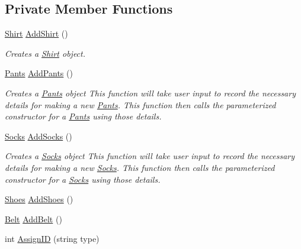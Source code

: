 \subsection*{Private Member Functions}
\begin{DoxyCompactItemize}
\item 
\mbox{\hyperlink{classShirt}{Shirt}} \mbox{\hyperlink{classCloset_aba3296cf8964b43f64911cc69c56cbfd}{Add\+Shirt}} ()
\begin{DoxyCompactList}\small\item\em Creates a \textquotesingle{}\mbox{\hyperlink{classShirt}{Shirt}}\textquotesingle{} object. \end{DoxyCompactList}\item 
\mbox{\hyperlink{classPants}{Pants}} \mbox{\hyperlink{classCloset_a86001d9aab63ec5cca05bb2daa67e755}{Add\+Pants}} ()
\begin{DoxyCompactList}\small\item\em Creates a \textquotesingle{}\mbox{\hyperlink{classPants}{Pants}}\textquotesingle{} object  This function will take user input to record the necessary details for making a new \textquotesingle{}\mbox{\hyperlink{classPants}{Pants}}\textquotesingle{}. This function then calls the parameterized constructor for a \textquotesingle{}\mbox{\hyperlink{classPants}{Pants}}\textquotesingle{} using those details. \end{DoxyCompactList}\item 
\mbox{\hyperlink{classSocks}{Socks}} \mbox{\hyperlink{classCloset_aac44ecf78525b3e0ac4ed80af2133186}{Add\+Socks}} ()
\begin{DoxyCompactList}\small\item\em Creates a \textquotesingle{}\mbox{\hyperlink{classSocks}{Socks}}\textquotesingle{} object This function will take user input to record the necessary details for making a new \textquotesingle{}\mbox{\hyperlink{classSocks}{Socks}}\textquotesingle{}. This function then calls the parameterized constructor for a \textquotesingle{}\mbox{\hyperlink{classSocks}{Socks}}\textquotesingle{} using those details. \end{DoxyCompactList}\item 
\mbox{\hyperlink{classShoes}{Shoes}} \mbox{\hyperlink{classCloset_a489badac5a919460e8cc8e216f8b3eac}{Add\+Shoes}} ()
\item 
\mbox{\hyperlink{classBelt}{Belt}} \mbox{\hyperlink{classCloset_ad81782f2bb110f3a0a635a5ac1f929eb}{Add\+Belt}} ()
\item 
int \mbox{\hyperlink{classCloset_afabc27d621abdf0089a6b3027ea8f470}{Assign\+ID}} (string type)
\end{DoxyCompactItemize}
